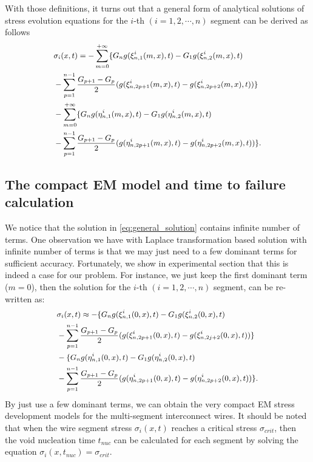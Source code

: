 With those definitions, it turns out that a general form of analytical
solutions of stress evolution equations for the $i$-th
$(i=1,2,\cdots,n)$ segment can be derived as follows
\begin{equation} \label{eq:general_solution}\small
\begin{split}
&\sigma_{i}(x,t)=-\sum\limits_{m=0}^{+\infty}\{G_ng(\xi_{n,1}^{i}(m,x),t)-G_1g(\xi_{n,2}^{i}(m,x),t)\\
&-\sum\limits_{p=1}^{n-1}\frac{G_{p+1}-G_p}{2}(g(\xi_{n,2p+1}^{i}(m,x),t)-g(\xi_{n,2p+2}^{i}(m,x),t))\}\\
&-\sum\limits_{m=0}^{+\infty}\{G_ng(\eta_{n,1}^{i}(m,x),t)-G_1g(\eta_{n,2}^{i}(m,x),t)\\
&-\sum\limits_{p=1}^{n-1}\frac{G_{p+1}-G_p}{2}(g(\eta_{n,2p+1}^{i}(m,x),t)-g(\eta_{n,2p+2}^{i}(m,x),t))\}.
 \end{split}
 \end{equation}

\subsection{The compact EM model and time to failure calculation}
 We notice that the solution in \eqref{eq:general_solution} contains
 infinite number of terms. One observation we have with Laplace
 transformation based solution with infinite number of terms is that
 we may just need to a few dominant terms for sufficient accuracy.
 Fortunately, we show in experimental section that this is indeed a
 case for our problem. For instance, we just keep the first dominant
 term ($m=0$), then the solution for the $i$-th $(i=1,2,\cdots,n)$
 segment, can be re-written as:
\begin{equation} \label{eq:approximate_solution}\small
\begin{split}
&\sigma_{i}(x,t)\approx-\{G_ng(\xi_{n,1}^{i}(0,x),t)-G_1g(\xi_{n,2}^{i}(0,x),t)\\
&-\sum\limits_{p=1}^{n-1}\frac{G_{p+1}-G_p}{2}(g(\xi_{n,2p+1}^{i}(0,x),t)-g(\xi_{n,2j+2}^{i}(0,x),t))\}\\
&-\{G_ng(\eta_{n,1}^{i}(0,x),t)-G_1g(\eta_{n,2}^{i}(0,x),t)\\
&-\sum\limits_{p=1}^{n-1}\frac{G_{p+1}-G_p}{2}(g(\eta_{n,2p+1}^{i}(0,x),t)-g(\eta_{n,2p+2}^{i}(0,x),t))\}.
 \end{split}
 \end{equation}
 By just use a few dominant terms, we can obtain the very compact EM
 stress development models for the multi-segment interconnect wires.
 It should be noted that when the wire segment stress
 $\sigma_{i}(x,t)$ reaches a critical stress $\sigma_{crit}$, then the
 void nucleation time $t_{nuc}$ can be calculated for each segment by
 solving the equation $\sigma_{i}(x,t_{nuc})=\sigma_{crit}$.
 
